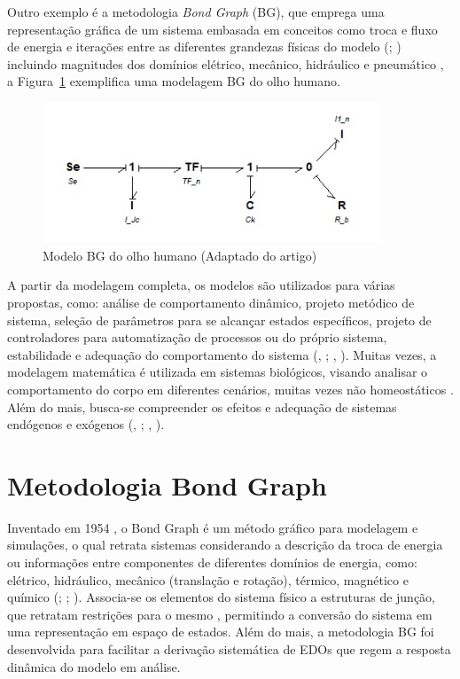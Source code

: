 Outro exemplo é a metodologia \textit{Bond Graph} (BG), que emprega uma representação gráfica de um sistema embasada em conceitos como troca e fluxo de energia e iterações entre as diferentes grandezas físicas do modelo (\cite{Rosa2014}; \cite{DeOliveira2016}) incluindo magnitudes dos domínios elétrico, mecânico, hidráulico e pneumático \cite{garcia}, a Figura~\ref{exemplo_bg1} exemplifica uma modelagem BG do olho humano.

\begin{figure}[htb]
 \begin{center}
  \includegraphics[width=4.0in]{figuras/olho_diabetico.jpg}
   \caption{{Modelo BG do olho humano (Adaptado do artigo)}}\label{exemplo_bg1}
  \end{center}
\end{figure}

A partir da modelagem completa, os modelos são utilizados para várias propostas, como: análise de comportamento dinâmico, projeto metódico de sistema, seleção de parâmetros para se alcançar estados específicos, projeto de controladores para automatização de processos ou do próprio sistema, estabilidade e adequação do comportamento do sistema (\citeauthor{Aguirre2004}, \citeyear{Aguirre2004}; \citeauthor{Kypuros2013}, \citeyear{Kypuros2013}). Muitas vezes, a modelagem matemática é utilizada em sistemas biológicos, visando analisar o comportamento do corpo em diferentes cenários, muitas vezes não homeostáticos \cite{DeOliveira2016}. Além do mais, busca-se compreender os efeitos e adequação de sistemas endógenos e exógenos (\citeauthor{Rosa2013}, \citeyear{Rosa2013}; \citeauthor{Rosa2014}, \citeyear{Rosa2014}). 

\section{Metodologia Bond Graph}

Inventado em 1954 \cite{borutzky2011}, o Bond Graph é um método gráfico para modelagem e simulações, o qual retrata sistemas considerando a descrição da troca de energia ou informações entre componentes de diferentes domínios de energia, como: elétrico, hidráulico, mecânico (translação e rotação), térmico, magnético e químico (\cite{Rosa2013}; \cite{balthazar}; \cite{Alabakhshizadeh2011}). Associa-se os elementos do sistema físico a estruturas de junção, que retratam restrições para o mesmo \cite{gawthrop}, permitindo a conversão do sistema em uma representação em espaço de estados. Além do mais, a metodologia BG  foi desenvolvida para facilitar a derivação sistemática de EDOs que regem a resposta dinâmica do modelo em análise.

